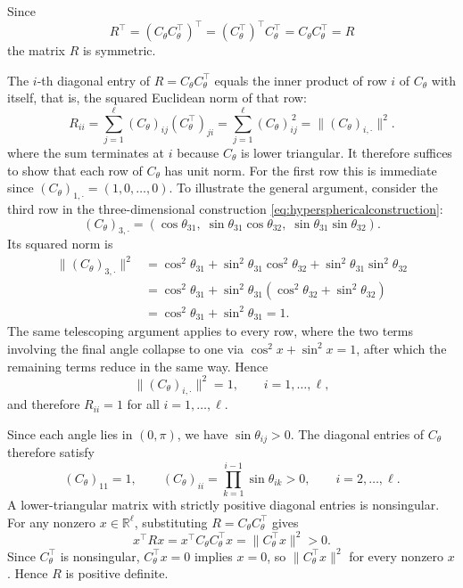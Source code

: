 \begin{description}[
    style=unboxed,
    leftmargin=0pt,
    labelindent=0pt,
    labelsep=0.5em
]

\item[Symmetry.]

Since
\[
R^\top
=
\left(C_\theta C_\theta^\top\right)^\top
=
\left(C_\theta^\top\right)^\top C_\theta^\top
=
C_\theta C_\theta^\top
=
R
\]
the matrix \(R\) is symmetric.


\item[Unit diagonal.]



The $i$-th diagonal entry of $R=C_\theta C_\theta^\top$ equals the inner 
product of row $i$ of $C_\theta$ with itself, that is, the squared Euclidean 
norm of that row:
\[
R_{ii}
=
\sum_{j=1}^{\ell}(C_\theta)_{ij}(C_\theta^\top)_{ji}
=
\sum_{j=1}^{\ell}(C_\theta)_{ij}^{\,2}
=
\|(C_\theta)_{i,\cdot}\|^2.
\]
where the sum terminates at $i$ because $C_\theta$ is lower triangular. It therefore suffices to show that each row of $C_\theta$ has unit norm. For the first row this is immediate since $(C_\theta)_{1,\cdot}=(1,0,\ldots,0)$. 
To illustrate the general argument, consider the third row in the three-dimensional construction \eqref{eq:hypersphericalconstruction}:
\[
(C_\theta)_{3,\cdot}
=
\left(
\cos\theta_{31},
\;
\sin\theta_{31}\cos\theta_{32},
\;
\sin\theta_{31}\sin\theta_{32}
\right).
\]
Its squared norm is
\[
\begin{aligned}
\|(C_\theta)_{3,\cdot}\|^2
&=
\cos^2\theta_{31}
+
\sin^2\theta_{31}\cos^2\theta_{32}
+
\sin^2\theta_{31}\sin^2\theta_{32} \\
&=
\cos^2\theta_{31}
+
\sin^2\theta_{31}
\left(
\cos^2\theta_{32}
+
\sin^2\theta_{32}
\right) \\
&=
\cos^2\theta_{31}
+
\sin^2\theta_{31}
=
1.
\end{aligned}
\]
The same telescoping argument applies to every row, where the two terms involving the final angle collapse to one via $\cos^2 x+\sin^2 x=1$, after which the 
remaining terms reduce in the same way. Hence
\[
\|(C_\theta)_{i,\cdot}\|^2=1,\qquad i=1,\ldots,\ell,
\]
and therefore $R_{ii}=1$ for all $i=1,\ldots,\ell$.

\item[Positive definiteness.]

Since each angle lies in \((0,\pi)\), we have $\sin\theta_{ij}>0.$ The diagonal entries of \(C_\theta\) therefore satisfy
\[
(C_\theta)_{11}=1,
\qquad
(C_\theta)_{ii}
=
\prod_{k=1}^{i-1}\sin\theta_{ik}
>
0,
\qquad
i=2,\ldots,\ell.
\]
A lower-triangular matrix with strictly positive diagonal entries is nonsingular. For any nonzero $x\in\mathbb{R}^{\ell}$, substituting $R=C_\theta C_\theta^\top$ gives
\[
x^\top R x = x^\top C_\theta C_\theta^\top x =
\|C_\theta^\top x\|^2
>
0.
\]
Since $C_\theta^\top$ is nonsingular, $C_\theta^\top x=0$ implies $x=0$, so $\|C_\theta^\top x\|^2$ for every nonzero $x$. Hence $R$ is positive definite.
\end{description}

